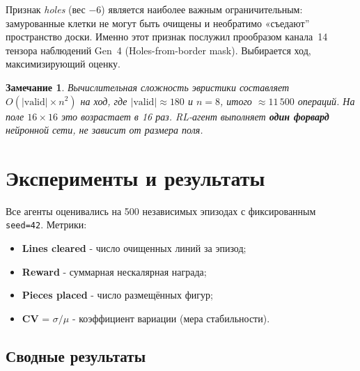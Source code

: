 \documentclass[12pt, a4paper]{article}
\newtheorem{remark}{Замечание}
\begin{document}
Признак \textit{holes} (вес $-6$) является наиболее важным ограничительным: замурованные клетки не могут быть очищены и необратимо «съедают'' пространство доски. Именно этот признак послужил прообразом канала~14 тензора наблюдений Gen~4 (Holes-from-border mask). Выбирается ход, максимизирующий оценку.

\begin{remark}
  Вычислительная сложность эвристики составляет $O(|\text{valid}| \times n^2)$ на ход, где $|\text{valid}| \approx 180$ и $n=8$, итого $\approx 11\,500$ операций. На поле $16\times 16$ это возрастает в 16 раз. RL-агент выполняет \textbf{один форвард} нейронной сети, не зависит от размера поля.
\end{remark}

\section{Эксперименты и результаты}

Все агенты оценивались на 500 независимых эпизодах с фиксированным \texttt{seed=42}. Метрики:
\begin{itemize}
  \item \textbf{Lines cleared} - число очищенных линий за эпизод;
  \item \textbf{Reward} - суммарная нескалярная награда;
  \item \textbf{Pieces placed} - число размещённых фигур;
  \item \textbf{CV} = $\sigma / \mu$ - коэффициент вариации (мера стабильности).
\end{itemize}

\subsection{Сводные результаты}
\end{document}
